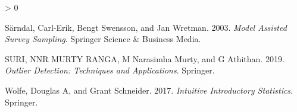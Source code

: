 \documentclass[
]{book}
\newlength{\cslhangindent}
\newenvironment{CSLReferences}[2] %
 {%
  \setlength{\parindent}{0pt}
  \ifodd #1 \everypar{\setlength{\hangindent}{\cslhangindent}}\ignorespaces\fi
  \ifnum #2 > 0
  \setlength{\parskip}{#2\baselineskip}
  \fi
 }%
 {}
\begin{document}
\begin{CSLReferences}{1}{0}
\leavevmode\hypertarget{ref-sarndal2003model}{}%
Särndal, Carl-Erik, Bengt Swensson, and Jan Wretman. 2003. \emph{Model Assisted Survey Sampling}. Springer Science \& Business Media.

\leavevmode\hypertarget{ref-suri2019outlier}{}%
SURI, NNR MURTY RANGA, M Narasimha Murty, and G Athithan. 2019. \emph{Outlier Detection: Techniques and Applications}. Springer.

\leavevmode\hypertarget{ref-wolfe2017intuitive}{}%
Wolfe, Douglas A, and Grant Schneider. 2017. \emph{Intuitive Introductory Statistics}. Springer.

\end{CSLReferences}
\end{document}

